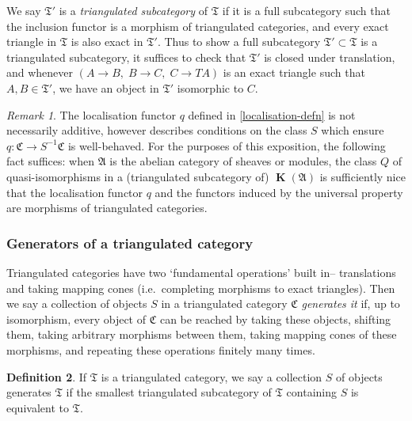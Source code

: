 \documentclass[a4paper]{article}
\theoremstyle{definition}
\newtheorem{defn}{Definition}[section]
\theoremstyle{remark}
\newtheorem{remark}[defn]{Remark}
\DeclareMathOperator{\kom}{{\mathbf{K}}}
\begin{document}
We say \(\mathfrak{T}'\) is a \textit{triangulated subcategory} of
\(\mathfrak{T}\) if it is a full subcategory such that the
inclusion functor is a morphism of triangulated categories, and every exact
triangle in \(\mathfrak{T}\) is also exact in \(\mathfrak{T}'\). Thus to show a full
subcategory \(\mathfrak{T}'\subset \mathfrak{T}\) is a triangulated subcategory,
it suffices to check that \(\mathfrak{T}'\) is closed under translation, and
whenever \((A\rightarrow B,\; B\rightarrow C,\; C\rightarrow TA)\) is an exact
triangle such that \(A,B\in \mathfrak{T}'\), we have an object in \(
\mathfrak{T}'\) isomorphic to \(C\). 

\begin{remark}\label{is-localisation-additive}
    The localisation functor \(q\) defined in \cref{localisation-defn} is not
    necessarily additive, however 
    describes  conditions on the class \(S\) which ensure
    \(q:\mathfrak{C}\rightarrow S^{-1}\mathfrak{C}\) is well-behaved.
    For the purposes of this exposition, the following fact suffices: when
    \(\mathfrak{A}\) is the abelian category of sheaves or modules, the class
    \(Q\) of quasi-isomorphisms in a (triangulated subcategory of)
    \(\kom(\mathfrak{A})\) is sufficiently nice that the localisation functor
    \(q\) and the functors induced by the universal property are morphisms of
    triangulated categories.
\end{remark}

\subsubsection{Generators of a triangulated category}
Triangulated categories have two `fundamental operations' built
in-- translations and taking mapping cones (i.e.\ completing morphisms to exact
triangles). Then we say a collection of objects \(S\) in a triangulated category
\(\mathfrak{C}\) \textit{generates it} if, up to isomorphism, every object of
\(\mathfrak{C}\) can be reached by taking these objects, shifting them, taking
arbitrary morphisms between them, taking mapping cones of these morphisms, and
repeating these operations finitely many times. 

\begin{defn}
    If \(\mathfrak{T}\) is a triangulated category, we say a collection \(S\) of
    objects generates \(\mathfrak{T}\) if the smallest triangulated
    subcategory of \(\mathfrak{T}\) containing \(S\) is equivalent to
    \(\mathfrak{T}\).
\end{defn}
\end{document}
